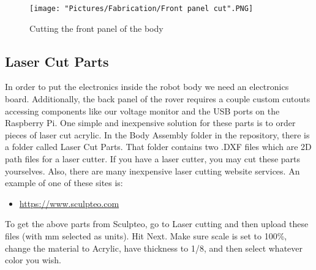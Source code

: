 \documentclass[12pt]{article}
\begin{document}


\begin{figure}[H]
	\centering
	\texttt{[image: "Pictures/Fabrication/Front panel cut".PNG]}
  	\caption{Cutting the front panel of the body}
  	\label{fb panel cut}
\end{figure}


\subsection{Laser Cut Parts}

In order to put the electronics inside the robot body we need an electronics board.  Additionally, the back panel of the rover requires a couple custom cutouts accessing components like our voltage monitor and the USB ports on the Raspberry Pi. One simple and inexpensive solution for these parts is to order pieces of laser cut acrylic. In the Body Assembly folder in the repository, there is a folder called Laser Cut Parts. That folder contains two .DXF files which are 2D path files for a laser cutter.  If you have a laser cutter, you may cut these parts yourselves.  Also, there are many inexpensive laser cutting website services. An example of one of these sites is:

\begin{itemize}
	\item \href{https://www.sculpteo.com}{https://www.sculpteo.com}
\end{itemize}

To get the above parts from Sculpteo, go to Laser cutting and then upload these files (with mm selected as units). Hit Next. Make sure scale is set to 100\%, change the material to Acrylic, have thickness to 1/8, and then select whatever color you wish.
\end{document}
